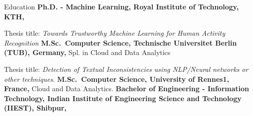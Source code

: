 \begin{rubric}{Education}
\entry*[2020 -- 2024]%
	\textbf{Ph.D. - Machine Learning, Royal Institute of Technology, KTH,} 
	\par Thesis title: \emph{Towards Trustworthy Machine Learning for Human Activity Recognition}
%
\entry*[2015 -- 2017]%
	\textbf{M.Sc.~Computer Science, Technische Universitet Berlin (TUB), Germany,} Spl. in Cloud and Data Analytics\par
	Thesis title: \emph{Detection of Textual Inconsistencies using NLP/Neural networks or other techniques}.
% 
\entry*[2015 -- 2017]%
	\textbf{M.Sc.~Computer Science, University of Rennes1, France,} Cloud and Data Analytics.
\entry*[2008 -- 2012]%
	\textbf{Bachelor of Engineering -  Information Technology, Indian Institute of Engineering Science and Technology (IIEST), Shibpur,}
\end{rubric}